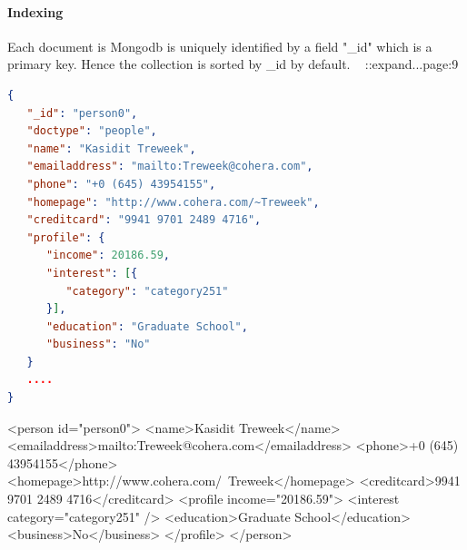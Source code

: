 \paragraph{Indexing} 
	Each document is Mongodb is uniquely identified by a field "\_id" which is a primary key. Hence the collection is sorted by \_id by default. ~\cite{nosql/comparision} ::expand...page:9

	


\begin{lstlisting}[language=json,firstnumber=1]
{
   "_id": "person0",
   "doctype": "people",
   "name": "Kasidit Treweek",
   "emailaddress": "mailto:Treweek@cohera.com",
   "phone": "+0 (645) 43954155",
   "homepage": "http://www.cohera.com/~Treweek",
   "creditcard": "9941 9701 2489 4716",
   "profile": {
      "income": 20186.59,
      "interest": [{
         "category": "category251"
      }],
      "education": "Graduate School",
      "business": "No"
   }
   ....
}
\end{lstlisting} 
\begin{fakeXML}[label=kml,caption=A simple KML example representing a Point]

<person id="person0">
   <name>Kasidit Treweek</name>
   <emailaddress>mailto:Treweek@cohera.com</emailaddress>
   <phone>+0 (645) 43954155</phone>
   <homepage>http://www.cohera.com/~Treweek</homepage>
   <creditcard>9941 9701 2489 4716</creditcard>
   <profile income="20186.59">
      <interest category="category251" />
      <education>Graduate School</education>
      <business>No</business>
   </profile>
</person>
\end{fakeXML} 

	
	
